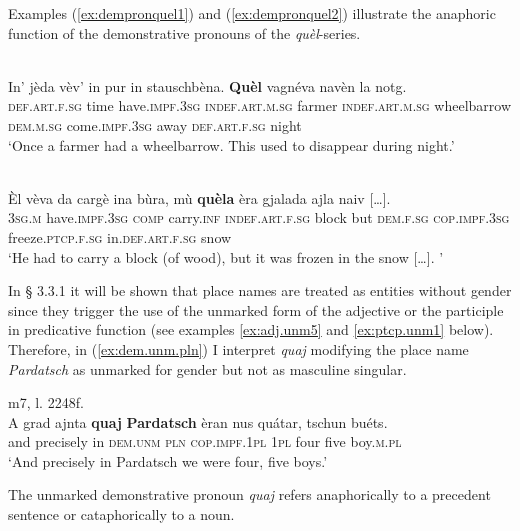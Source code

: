 Examples (\ref{ex:dempronquel1}) and (\ref{ex:dempronquel2}) illustrate the anaphoric function of the demonstrative pronouns of the \textit{quèl}-series.

\ea
\label{ex:dempronquel1}
\\
\gll    In' jèda vèv’ in pur in stauschbèna. \textbf{Quèl} vagnéva navèn la notg.\\
     \textsc{def.art.f.sg} time have.\textsc{impf.3sg} \textsc{indef.art.m.sg} farmer \textsc{indef.art.m.sg} wheelbarrow \textsc{dem.m.sg} come.\textsc{impf.3sg} away \textsc{def.art.f.sg} night\\
\glt `Once a farmer had a wheelbarrow. This used to disappear during night.'
\z

\ea\label{ex:dempronquel2}
\\
\gll    Èl vèva da cargè ina bùra, mù \textbf{quèla} èra gjalada ajla naiv […].\\
    \textsc{3sg.m} have.\textsc{impf.3sg} \textsc{comp} carry.\textsc{inf} \textsc{indef.art.f.sg} block but \textsc{dem.f.sg} \textsc{cop.impf.3sg} freeze.\textsc{ptcp.f.sg} in.\textsc{def.art.f.sg} snow\\
\glt `He had to carry a block (of wood), but it was frozen in the snow […]. '
\z

In § 3.3.1 it will be shown that place names are treated as entities without gender since they trigger the use of the unmarked form of the adjective or the participle in predicative function (see examples \ref{ex:adj.unm5} and \ref{ex:ptcp.unm1} below). Therefore, in (\ref{ex:dem.unm.pln}) I interpret \textit{quaj} modifying the place name \textit{Pardatsch} as unmarked for gender but not as masculine singular.

\ea
\label{ex:dem.unm.pln}
 {m7, l. 2248f.}\\
	\gll A grad ajnta \textbf{quaj} \textbf{Pardatsch} èran nus quátar, tschun buéts.   \\
and precisely in \textsc{dem.unm} \textsc{pln} \textsc{cop.impf.1pl} \textsc{1pl} four five boy.\textsc{m.pl}\\
\glt `And precisely in Pardatsch we were four, five boys.'
\z


The unmarked demonstrative pronoun \textit{quaj} refers anaphorically to a precedent sentence or cataphorically to a noun.

\ea

